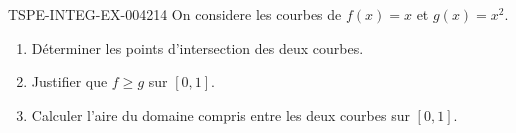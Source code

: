 \begin{exercice}{TSPE-INTEG-EX-004}{2}{14}
On considere les courbes de $f(x)=x$ et $g(x)=x^2$.
\begin{enumerate}
  \item Déterminer les points d'intersection des deux courbes.
  \item Justifier que $f \geq g$ sur $[0,1]$.
  \item Calculer l'aire du domaine compris entre les deux courbes sur $[0,1]$.
\end{enumerate}
\end{exercice}
